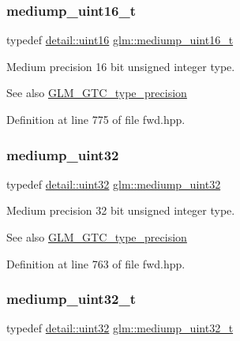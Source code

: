 \subsubsection{\texorpdfstring{mediump\_uint16\_t}{mediump\_uint16\_t}}
{\footnotesize\ttfamily typedef \mbox{\hyperlink{namespaceglm_1_1detail_a47b2a7d006d187338e8031a352d1ce56}{detail\+::uint16}} \mbox{\hyperlink{group__gtc__type__precision_ga0b385466deac5ac96061ef2cdd6db20f}{glm\+::mediump\+\_\+uint16\+\_\+t}}}

Medium precision 16 bit unsigned integer type. \begin{DoxySeeAlso}{See also}
\mbox{\hyperlink{group__gtc__type__precision}{G\+L\+M\+\_\+\+G\+T\+C\+\_\+type\+\_\+precision}} 
\end{DoxySeeAlso}


Definition at line 775 of file fwd.\+hpp.

\mbox{\label{group__gtc__type__precision_ga861dbd1051f488e425b3966001b568e5}} 
\subsubsection{\texorpdfstring{mediump\_uint32}{mediump\_uint32}}
{\footnotesize\ttfamily typedef \mbox{\hyperlink{namespaceglm_1_1detail_ade6cfbf377022aaa391af8cd50489222}{detail\+::uint32}} \mbox{\hyperlink{group__gtc__type__precision_ga861dbd1051f488e425b3966001b568e5}{glm\+::mediump\+\_\+uint32}}}

Medium precision 32 bit unsigned integer type. \begin{DoxySeeAlso}{See also}
\mbox{\hyperlink{group__gtc__type__precision}{G\+L\+M\+\_\+\+G\+T\+C\+\_\+type\+\_\+precision}} 
\end{DoxySeeAlso}


Definition at line 763 of file fwd.\+hpp.

\mbox{\label{group__gtc__type__precision_gac7782c1e393f9ad47e41a177a685f287}} 
\subsubsection{\texorpdfstring{mediump\_uint32\_t}{mediump\_uint32\_t}}
{\footnotesize\ttfamily typedef \mbox{\hyperlink{namespaceglm_1_1detail_ade6cfbf377022aaa391af8cd50489222}{detail\+::uint32}} \mbox{\hyperlink{group__gtc__type__precision_gac7782c1e393f9ad47e41a177a685f287}{glm\+::mediump\+\_\+uint32\+\_\+t}}}

